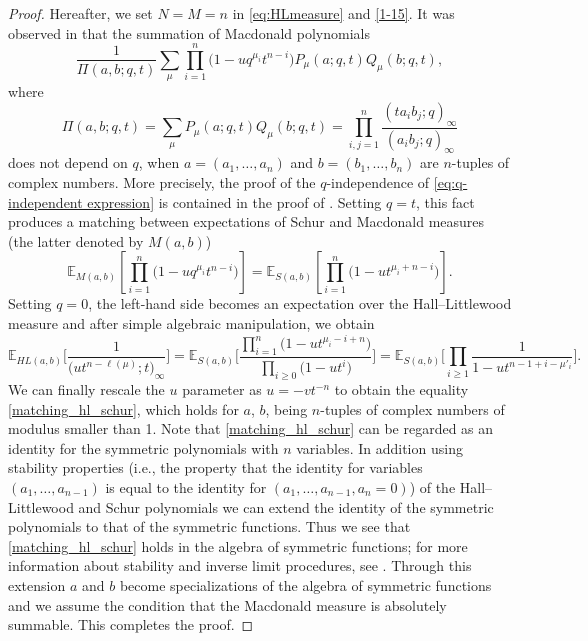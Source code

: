 \documentclass[pdftex]{sigma}
\numberwithin{equation}{section}
\begin{document}
\begin{proof} Hereafter, we set $N=M=n$ in \eqref{eq:HLmeasure} and \eqref{1-15}.
	It was observed in \cite{macdonald1998symmetric} that the summation of Macdonald polynomials
 \begin{equation} \label{eq:q-independent expression}
 \frac{1}{\Pi(a,b;q,t)} \sum_\mu \prod_{i=1}^n\big(1-uq^{\mu_i} t^{n-i}\big) P_\mu(a;q,t) Q_\mu(b;q,t),
 \end{equation}
 where
 \[
 \Pi(a,b;q,t) = \sum_{\mu} P_\mu(a;q,t) Q_\mu(b;q,t) = \prod_{i,j=1}^n \frac{(t a_i b_j;q)_\infty}{(a_i b_j;q)_\infty}
 \]
 does not depend on $q$, when $a=(a_1,\dots,a_n)$ and $b=(b_1,\dots,b_n)$ are $n$-tuples of complex numbers. More precisely, the proof of the $q$-independence of \eqref{eq:q-independent expression} is contained in the proof of \cite[Chapter VI, Section~3, equation~(3.12)]{macdonald1998symmetric}. Setting $q=t$, this fact produces a matching between expectations of Schur and Macdonald measures (the latter denoted by $M(a,b)$)
 \[
 \mathbb{E}_{M(a,b)}\left[ \prod_{i=1}^n \big(1-uq^{\mu_i} t^{n-i}\big) \right] = \mathbb{E}_{S(a,b)}\left[ \prod_{i=1}^n \big(1-u t^{\mu_i + n-i}\big) \right].
 \]
 Setting $q=0$, the left-hand side becomes an expectation over the Hall--Littlewood measure and after simple algebraic manipulation, we obtain
 \begin{equation*}
 \mathbb{E}_{HL(a,b)}\Bigg[ \frac{1}{\big(ut^{n-\ell(\mu)};t\big)_\infty} \Bigg] = \mathbb{E}_{S(a,b)}\Bigg[ \frac{ \prod_{i=1}^n \big(1 - u t^{\mu_{i} - i + n}\big) }{ \prod_{i\ge0} \big(1- u t^{i} \big) } \Bigg]
 =
 \mathbb{E}_{S(a,b)}\Bigg[ \prod_{i\ge 1} \frac{1}{1-u t^{n-1+i-\mu'_i}} \Bigg].
 \end{equation*}
 We can finally rescale the $u$ parameter as $u=-vt^{-n}$ to obtain the equality \eqref{matching_hl_schur}, which holds for $a$, $b$, being $n$-tuples of complex numbers of modulus smaller than 1. Note that \eqref{matching_hl_schur} can be regarded as an identity for the symmetric polynomials with $n$ variables. In addition using stability properties (i.e., the property that the identity for variables $(a_1,\dots,a_{n-1})$ is equal to the identity for $(a_1,\dots,a_{n-1},a_n=0)$) %
 of the Hall--Littlewood and Schur polynomials we can extend the identity of the symmetric polynomials to that of the
 symmetric functions. Thus we see that \eqref{matching_hl_schur} holds in the algebra of symmetric functions; for more information about stability and inverse limit procedures, see \cite[Chapter~I.2]{macdonald1998symmetric}. Through this extension $a$ and $b$ become specializations of the algebra of symmetric functions and we assume the condition that the Macdonald measure is absolutely summable. This completes the proof.
\end{proof}
\end{document}
